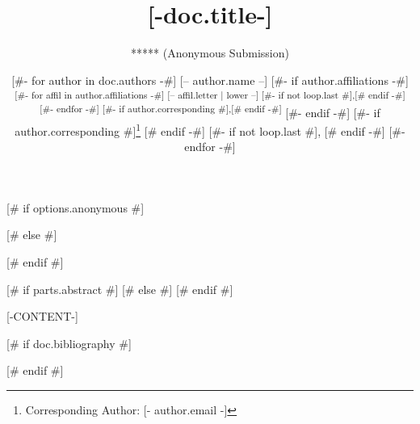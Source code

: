 \documentclass{isprs} %
\begin{document}
\title{[-doc.title-]}
\date{}


[# if options.anonymous #]
\author{***** (Anonymous Submission)}
\address{**** (Anonymous Submission)}
[# else #]
\author{
[#- for author in doc.authors -#]
[-- author.name --]
[#- if author.affiliations -#]
\textsuperscript{
	[#- for affil in author.affiliations -#]
		[-- affil.letter | lower --]
		[#- if not loop.last #],[# endif -#]
	[#- endfor -#]
[#- if author.corresponding #],[# endif -#]
}
[#- endif -#]
[#- if author.corresponding #]\thanks{Corresponding Author: [- author.email -]} [# endif -#]
[#- if not loop.last #], [# endif -#]
[#- endfor -#]
}
\address{
	[#- for affil in doc.affiliations -#]
	\textsuperscript{[- affil.letter | lower -]}
	[-affil.value-]
	[#- endfor -#]
}
[# endif #]



\icwg{}   %

[# if parts.abstract #]
[# else #]
[# endif #]


\maketitle


[-CONTENT-]

[# if doc.bibliography #]
{
	\begin{spacing}{1.17}
		\normalsize
	\end{spacing}
}
[# endif #]
\end{document}
